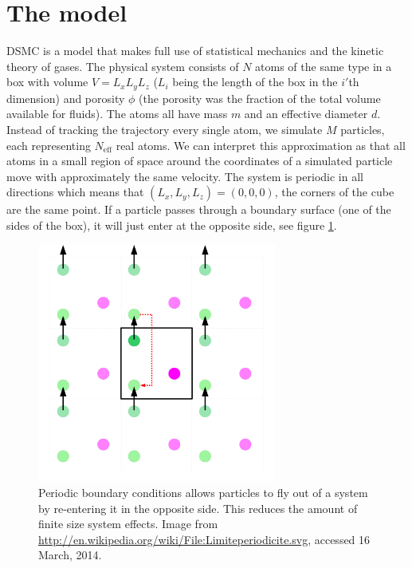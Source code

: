 \section{The model}
\label{sec:dsmc_model}
DSMC is a model that makes full use of statistical mechanics and the kinetic theory of gases. The physical system consists of $N$ atoms of the same type in a box with volume $V = L_xL_yL_z$ ($L_i$ being the length of the box in the $i'$th dimension) and porosity $\phi$ (the porosity was the fraction of the total volume available for fluids). The atoms all have mass $m$ and an effective diameter $d$. Instead of tracking the trajectory every single atom, we simulate $M$ particles, each representing $N_\text{eff}$ real atoms. We can interpret this approximation as that all atoms in a small region of space around the coordinates of a simulated particle move with approximately the same velocity. The system is periodic in all directions which means that $(L_x, L_y, L_z) = (0,0,0)$, the corners of the cube are the same point. If a particle passes through a boundary surface (one of the sides of the box), it will just enter at the opposite side, see figure \ref{fig:dsmc_periodic_boundary_conditions}.
\begin{figure}[ht]
\begin{center}
\includegraphics[width=0.7\textwidth, trim=0cm 0cm 0cm 0cm]{DSMC/figures/periodic_boundary_conditions.png}
\end{center}
\caption{Periodic boundary conditions allows particles to fly out of a system by re-entering it in the opposite side. This reduces the amount of finite size system effects. Image from \url{http://en.wikipedia.org/wiki/File:Limiteperiodicite.svg}, accessed 16 March, 2014.}
\label{fig:dsmc_periodic_boundary_conditions}
\end{figure}
